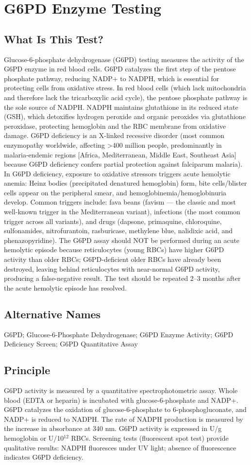 \chapter{G6PD Enzyme Testing}
\section*{What Is This Test?}
Glucose-6-phosphate dehydrogenase (G6PD) testing measures the activity of the G6PD enzyme in red blood cells. G6PD catalyzes the first step of the pentose phosphate pathway, reducing NADP+ to NADPH, which is essential for protecting cells from oxidative stress. In red blood cells (which lack mitochondria and therefore lack the tricarboxylic acid cycle), the pentose phosphate pathway is the sole source of NADPH. NADPH maintains glutathione in its reduced state (GSH), which detoxifies hydrogen peroxide and organic peroxides via glutathione peroxidase, protecting hemoglobin and the RBC membrane from oxidative damage. G6PD deficiency is an X-linked recessive disorder (most common enzymopathy worldwide, affecting >400 million people, predominantly in malaria-endemic regions [Africa, Mediterranean, Middle East, Southeast Asia] because G6PD deficiency confers partial protection against falciparum malaria). In G6PD deficiency, exposure to oxidative stressors triggers acute hemolytic anemia: Heinz bodies (precipitated denatured hemoglobin) form, bite cells/blister cells appear on the peripheral smear, and hemoglobinemia/hemoglobinuria develop. Common triggers include: fava beans (favism --- the classic and most well-known trigger in the Mediterranean variant), infections (the most common trigger across all variants), and drugs (dapsone, primaquine, chloroquine, sulfonamides, nitrofurantoin, rasburicase, methylene blue, nalidixic acid, and phenazopyridine). The G6PD assay should NOT be performed during an acute hemolytic episode because reticulocytes (young RBCs) have higher G6PD activity than older RBCs; G6PD-deficient older RBCs have already been destroyed, leaving behind reticulocytes with near-normal G6PD activity, producing a false-negative result. The test should be repeated 2--3 months after the acute hemolytic episode has resolved.
\section*{Alternative Names}
G6PD; Glucose-6-Phosphate Dehydrogenase; G6PD Enzyme Activity; G6PD Deficiency Screen; G6PD Quantitative Assay
\section*{Principle}
G6PD activity is measured by a quantitative spectrophotometric assay. Whole blood (EDTA or heparin) is incubated with glucose-6-phosphate and NADP+. G6PD catalyzes the oxidation of glucose-6-phosphate to 6-phosphogluconate, and NADP+ is reduced to NADPH. The rate of NADPH production is measured by the increase in absorbance at 340 nm. G6PD activity is expressed in U/g hemoglobin or U/10$^{12}$ RBCs. Screening tests (fluorescent spot test) provide qualitative results: NADPH fluoresces under UV light; absence of fluorescence indicates G6PD deficiency.
